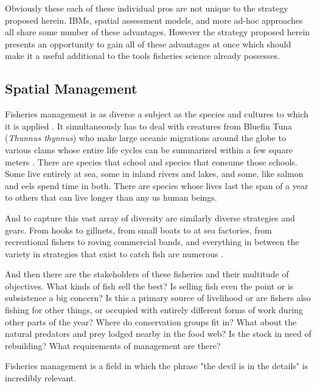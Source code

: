 \documentclass[11pt]{article}
\begin{document}
Obviously these each of these individual pros are not unique to the strategy proposed herein. IBMs, spatial assessment models, and more ad-hoc approaches all share some number of these advantages. However the strategy proposed herein presents an opportunity to gain all of these advantages at once which should make it a useful additional to the tools fisheries science already possesses. 
\newpage



\subsection{Spatial Management}

Fisheries management is as diverse a subject as the species and cultures to which it is applied \cite{waltersmartell} \cite{king}. It simultaneously has to deal with creatures from Bluefin Tuna (\textit{Thunnus thynnus}) who make large oceanic migrations around the globe to various clams whose entire life cycles can be summarized within a few square meters \cite{prince2010}. There are species that school and species that consume those schools. Some live entirely at sea, some in inland rivers and lakes, and some, like salmon and eels spend time in both. There are species whose lives last the span of a year to others that can live longer than any us human beings. 

And to capture this vast array of diversity are similarly diverse strategies and gears. From hooks to gillnets, from small boats to at sea factories, from recreational fishers to roving commercial bands, and everything in between the variety in strategies that exist to catch fish are numerous \cite{waltersmartell} \cite{king}. 

And then there are the stakeholders of these fisheries and their multitude of objectives. What kinds of fish sell the best? Is selling fish even the point or is subsistence a big concern? Is this a primary source of livelihood or are fishers also fishing for other things, or occupied with entirely different forms of work during other parts of the year? Where do conservation groups fit in? What about the natural predators and prey lodged nearby in the food web? Is the stock in need of rebuilding? What requirements of management are there? \cite{waltersmartell} \cite{king}

Fisheries management is a field in which the phrase "the devil is in the details" is incredibly relevant. \newline
\end{document}
